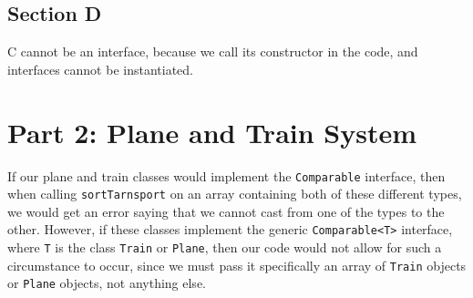 \documentclass{article}
\begin{document}
\subsection*{Section D}

C cannot be an interface, because we call its constructor in the code, and interfaces cannot be instantiated.

\section*{Part 2: Plane and Train System}

If our plane and train classes would implement the \verb`Comparable` interface, then when calling \verb`sortTarnsport` on an array containing both of these different types, we would get an error saying that we cannot cast from one of the types to the other. However, if these classes implement the generic \verb`Comparable<T>` interface, where \verb`T` is the class \verb`Train` or \verb`Plane`, then our code would not allow for such a circumstance to occur, since we must pass it specifically an array of \verb`Train` objects or \verb`Plane` objects, not anything else.
\end{document}
